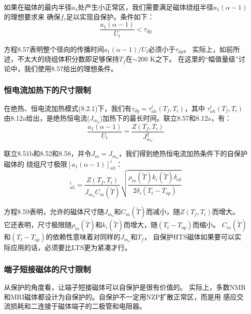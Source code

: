 如果在磁体的最内半径$a_1$处产生小正常区，我们需要满足磁体绕组半径$a_1(\alpha-1)$的理想要求来
确保$f_r$足以实现自保护。条件如下：
\begin{equation}%
\frac{a_1(\alpha-1)}{U_t}<\tau_{dg}
\end{equation}

方程8.57表明整个径向的传播时间$a_1(\alpha-1)/U_t$必须小于$\tau_{dg}$。
实际上，如前所述，不太大的绕组体积分数即足够保持$T_f$在$\sim 200$ K之下。
在这里的“幅值量级”讨论中，我们使用8.57给出的理想条件。

\subsubsection*{恒电流加热下的尺寸限制}
在绝热、恒电流加热模式(8.2.1)下，我们有$\tau_{dg}=\tau_{ah}^i(T_f,T_i)$，其中
$\tau_{ah}^i(T_f,T_i)$由8.12a给出，是绝热恒电流($J_{m_o}$)加热下的最长时间。联立8.57和8.12a，有：
\begin{equation}%
\frac{a_1(\alpha-1)}{U_t}=\frac{Z(T_f,T_i)}{J_{m_o}^{2}}
\end{equation}

联立8.51b和8.52和8.58，并令$J_m=J_{m_o}$，我们得到绝热恒电流加热条件下的自保护磁体的
绕组尺寸极限$[a_1(\alpha-1)]_{ah}^i$：
\begin{equation}%
[a_1(\alpha-1)]_{ah}^{i}=\frac{Z(T_f,T_i)}{J_{m_o}C_m(\tilde{T})}\sqrt{\frac{\rho_m(\tilde{T})k_i(\tilde{T})\delta_{cd}}{2\delta_i(T_t-T_{op})}}
\end{equation}

方程8.59表明，允许的磁体尺寸随$J_{m_o}$和$C_m(\tilde{T})$而减小，随$Z(T_f,T_i)$而增大。
它还表明，尺寸极限随$\rho_m(\tilde{T})$和$k_i(\tilde{T})$而增大，随$(T_t-T_{op})$而缩小。
$C_m(\tilde{T})$和$(T_t-T_{op})$的依赖性意味着对同样的$J_{m_o}$和$T_f$，
自保护HTS磁体如果要可以实际应用的话，必须要比LTS更为紧凑才行。

\subsubsection*{端子短接磁体的尺寸限制}
从保护的角度看，让端子短接磁体可以自保护是很有价值的。
实际上，多数NMR和MRI磁体都设计为自保护的。自保护不一定用NZP扩散正常区，而是用
感应交流损耗和二连接于磁体端子的二极管和电阻器。

